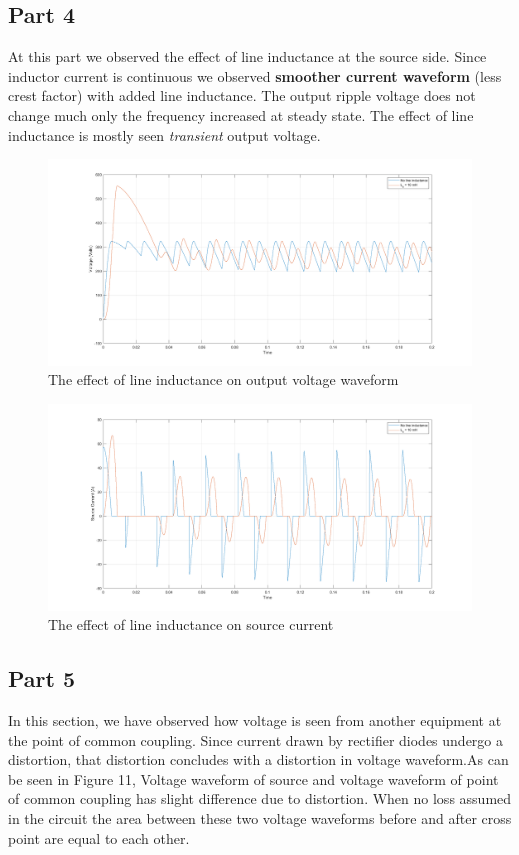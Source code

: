 \documentclass[fleqn, a4paper]{article}
\begin{document}
\subsection*{Part 4}
At this part we observed the effect of line inductance at the source side. Since inductor current is continuous we observed \textbf{smoother current waveform} (less crest factor) with added line inductance. The output ripple voltage does not change much only the frequency increased at steady state. The effect of line inductance is mostly seen \textit{transient} output voltage. 
\begin{figure}[H]
  \includegraphics[width=\linewidth]{part2d.png}
  \caption{The effect of line inductance on output voltage waveform}
  \label{fig:simulink3}
\end{figure}
\begin{figure}[H]
  \includegraphics[width=\linewidth]{part2d2.png}
  \caption{The effect of line inductance on source current}
  \label{fig:simulink3}
\end{figure}
\subsection*{Part 5}

In this section, we have observed how voltage is seen from another equipment at the point of common coupling. Since current drawn by rectifier diodes undergo a distortion, that distortion concludes with a distortion in voltage waveform.As can be seen in Figure 11, Voltage waveform of source and voltage waveform of point of common coupling has slight difference due to distortion. When no loss assumed in the circuit the area between these two voltage waveforms before and after cross point are equal to each other.
\end{document}
